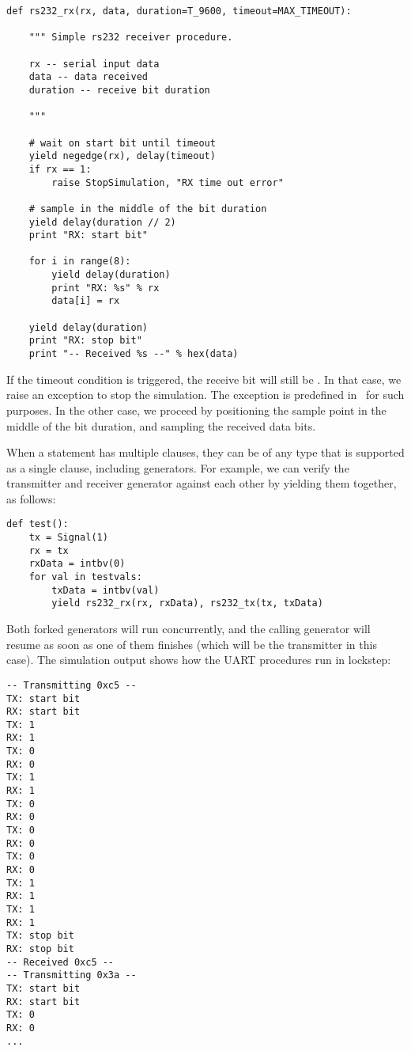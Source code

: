 \begin{verbatim}
def rs232_rx(rx, data, duration=T_9600, timeout=MAX_TIMEOUT):
    
    """ Simple rs232 receiver procedure.

    rx -- serial input data
    data -- data received
    duration -- receive bit duration
    
    """

    # wait on start bit until timeout
    yield negedge(rx), delay(timeout)
    if rx == 1:
        raise StopSimulation, "RX time out error"

    # sample in the middle of the bit duration
    yield delay(duration // 2)
    print "RX: start bit"

    for i in range(8):
        yield delay(duration)
        print "RX: %s" % rx
        data[i] = rx

    yield delay(duration)
    print "RX: stop bit"
    print "-- Received %s --" % hex(data)

\end{verbatim}

If the timeout condition is triggered, the receive bit 
will still be . In that case, we raise an exception to stop
the simulation. The  exception is predefined in
\myhdl\ for such purposes. In the other case, we proceed by
positioning the sample point in the middle of the bit duration, and
sampling the received data bits.

When a  statement has multiple clauses, they can be of any
type that is supported as a single clause, including generators. For
example, we can verify the transmitter and receiver generator against
each other by yielding them together, as follows:

\begin{verbatim}
def test():
    tx = Signal(1)
    rx = tx
    rxData = intbv(0)
    for val in testvals:
        txData = intbv(val)
        yield rs232_rx(rx, rxData), rs232_tx(tx, txData)

\end{verbatim}

Both forked generators will run concurrently, and the calling
generator will resume as soon as one of them finishes (which will be
the transmitter in this case).  The simulation output shows how
the UART procedures run in lockstep:

\begin{verbatim}
-- Transmitting 0xc5 --
TX: start bit
RX: start bit
TX: 1
RX: 1
TX: 0
RX: 0
TX: 1
RX: 1
TX: 0
RX: 0
TX: 0
RX: 0
TX: 0
RX: 0
TX: 1
RX: 1
TX: 1
RX: 1
TX: stop bit
RX: stop bit
-- Received 0xc5 --
-- Transmitting 0x3a --
TX: start bit
RX: start bit
TX: 0
RX: 0
...

\end{verbatim}

